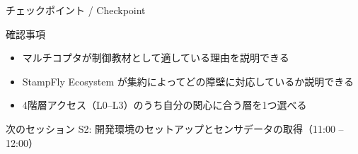\begin{frame}{チェックポイント / Checkpoint}
  \begin{alertblock}{確認事項}
    \begin{itemize}
      \item[$\square$] マルチコプタが制御教材として適している理由を説明できる
      \item[$\square$] StampFly Ecosystem が集約によってどの障壁に対応しているか説明できる
      \item[$\square$] 4階層アクセス（L0--L3）のうち自分の関心に合う層を1つ選べる
    \end{itemize}
  \end{alertblock}

  \vspace{1em}

  \begin{block}{次のセッション}
    S2: 開発環境のセットアップとセンサデータの取得（11:00 -- 12:00）
  \end{block}
\end{frame}

